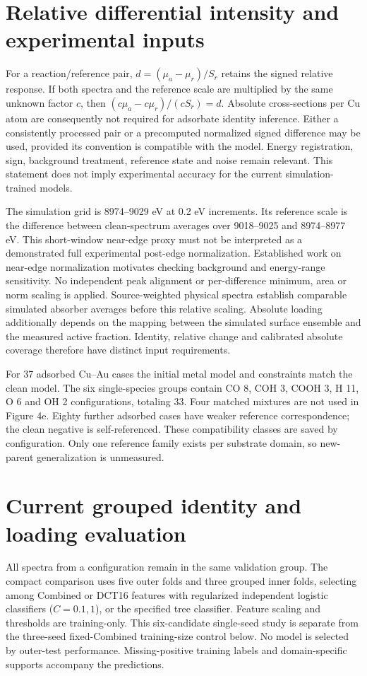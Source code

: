 \section{Relative differential intensity and experimental inputs}
For a reaction/reference pair, $d=(\mu_a-\mu_r)/S_r$ retains the signed relative response. If both spectra and the reference scale are multiplied by the same unknown factor $c$, then $(c\mu_a-c\mu_r)/(cS_r)=d$. Absolute cross-sections per Cu atom are consequently not required for adsorbate identity inference. Either a consistently processed pair or a precomputed normalized signed difference may be used, provided its convention is compatible with the model. Energy registration, sign, background treatment, reference state and noise remain relevant. This statement does not imply experimental accuracy for the current simulation-trained models.

The simulation grid is 8974--9029 eV at 0.2 eV increments. Its reference scale is the difference between clean-spectrum averages over 9018--9025 and 8974--8977 eV. This short-window near-edge proxy must not be interpreted as a demonstrated full experimental post-edge normalization. Established work on near-edge normalization motivates checking background and energy-range sensitivity.\cite{weng2005,bugarin2024} No independent peak alignment or per-difference minimum, area or norm scaling is applied. Source-weighted physical spectra establish comparable simulated absorber averages before this relative scaling. Absolute loading additionally depends on the mapping between the simulated surface ensemble and the measured active fraction. Identity, relative change and calibrated absolute coverage therefore have distinct input requirements.

For 37 adsorbed Cu--Au cases the initial metal model and constraints match the clean model. The six single-species groups contain CO 8, COH 3, COOH 3, H 11, O 6 and OH 2 configurations, totaling 33. Four matched mixtures are not used in Figure 4e. Eighty further adsorbed cases have weaker reference correspondence; the clean negative is self-referenced. These compatibility classes are saved by configuration. Only one reference family exists per substrate domain, so new-parent generalization is unmeasured.

\section{Current grouped identity and loading evaluation}
All spectra from a configuration remain in the same validation group. The compact comparison uses five outer folds and three grouped inner folds, selecting among Combined or DCT16 features with regularized independent logistic classifiers ($C=0.1,1$), or the specified tree classifier. Feature scaling and thresholds are training-only. This six-candidate single-seed study is separate from the three-seed fixed-Combined training-size control below. No model is selected by outer-test performance. Missing-positive training labels and domain-specific supports accompany the predictions.

